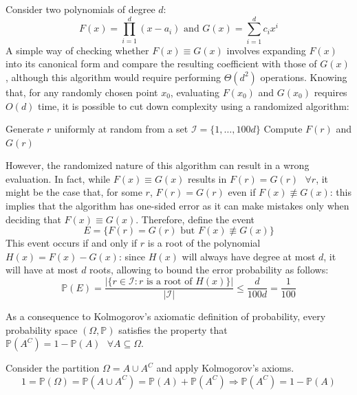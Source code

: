 \documentclass{report}
\begin{document}
\begin{examplebox}
    Consider two polynomials of degree $\displaystyle d$:
    \[F(x) = \prod_{i = 1}^d (x - a_i) \text{ and } G(x) = \sum_{i = 1}^d c_ix^i\]
    A simple way of checking whether $\displaystyle F(x) \equiv G(x)$ involves expanding $\displaystyle F(x)$ into its canonical form and compare the resulting coefficient with those of $\displaystyle G(x)$, although this algorithm would require performing $\displaystyle \Theta(d^2)$ operations. \newline
    Knowing that, for any randomly chosen point $\displaystyle x_0$, evaluating $\displaystyle F(x_0)$ and $\displaystyle G(x_0)$ requires $\displaystyle O(d)$ time, it is possible to cut down complexity using a randomized algorithm:
    \begin{algorithm}[H]
        \caption{Randomized Algorithm for Polynomial Identities.}

        Generate $\displaystyle r$ uniformly at random from a set $\displaystyle \mathcal{I} = \{1, \dots, 100d\}$\;
        Compute $\displaystyle F(r)$ and $\displaystyle G(r)$\;
    \end{algorithm}
    \noindent However, the randomized nature of this algorithm can result in a wrong evaluation. \newline
    In fact, while $\displaystyle F(x) \equiv G(x)$ results in $\displaystyle F(r) = G(r) \text{ } \forall r$, it might be the case that, for some $\displaystyle r$, $\displaystyle F(r) = G(r)$ even if $\displaystyle F(x) \not\equiv G(x)$: this implies that the algorithm has one-sided error as it can make mistakes only when deciding that $\displaystyle F(x) \equiv G(x)$. \newline
    Therefore, define the event
    \[E = \{F(r) = G(r) \text{ but } F(x) \not\equiv G(x)\}\]
    This event occurs if and only if $\displaystyle r$ is a root of the polynomial $\displaystyle H(x) = F(x) - G(x)$: since $\displaystyle H(x)$ will always have degree at most $\displaystyle d$, it will have at most $\displaystyle d$ roots, allowing to bound the error probability as follows:
    \[\mathbb{P}(E) = \frac{|\{r \in \mathcal{I} : r \text{ is a root of } H(x)\}|}{|\mathcal{I}|} \leq \frac{d}{100d} = \frac{1}{100}\]
\end{examplebox}
\noindent As a consequence to Kolmogorov's axiomatic definition of probability, every probability space $\displaystyle (\Omega, \mathbb{P})$ satisfies the property that $\displaystyle \mathbb{P}(A^C) = 1 - \mathbb{P}(A) \text{ } \forall A \subseteq \Omega$.
\begin{proofbox}
    Consider the partition $\displaystyle \Omega = A \cup A^C$ and apply Kolmogorov's axioms.
    \[1 = \mathbb{P}(\Omega) = \mathbb{P}(A \cup A^C) = \mathbb{P}(A) + \mathbb{P}(A^C) \Rightarrow \mathbb{P}(A^C) = 1 - \mathbb{P}(A)\]
\end{proofbox}
\end{document}
